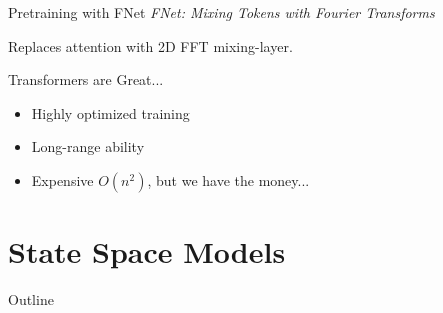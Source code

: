 \documentclass[14pt,aspectratio=169]{beamer}
\begin{document}

\begin{frame}{Pretraining with FNet}
    \textit{FNet: Mixing Tokens with Fourier Transforms} \cite{lee2021fnet}

    \vspace{0.5cm}
    
    Replaces attention with 2D FFT mixing-layer.

\end{frame}



\begin{frame}{Transformers are Great...}    
    \begin{itemize}
        \item Highly optimized training 
        \item Long-range ability
        \item Expensive $O(n^2)$, but we have the money...
    \end{itemize}
    \vspace{0.5cm}

\end{frame}

\section{State Space Models}
\begin{frame}{Outline}
    \tableofcontents[currentsection]
\end{frame}
\end{document}
